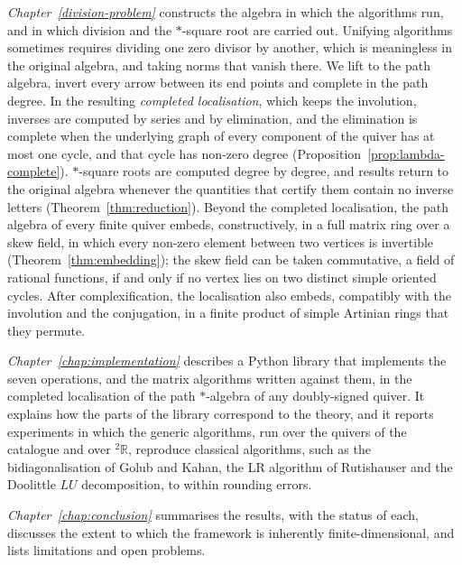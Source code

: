 \documentclass[12pt, a4paper]{report}
\theoremstyle{plain}
\theoremstyle{definition}
\theoremstyle{remark}
\theoremstyle{plain}
\newcommand{\twoR}{{}^{2}\mathbb{R}}
\begin{document}
\emph{Chapter~\ref{division-problem}} constructs the algebra in which the algorithms run, and in which division and the $*$-square root are carried out. Unifying algorithms sometimes requires dividing one zero divisor by another, which is meaningless in the original algebra, and taking norms that vanish there. We lift to the path algebra, invert every arrow between its end points and complete in the path degree. In the resulting \emph{completed localisation}, which keeps the involution, inverses are computed by series and by elimination, and the elimination is complete when the underlying graph of every component of the quiver has at most one cycle, and that cycle has non-zero degree (Proposition~\ref{prop:lambda-complete}). $*$-square roots are computed degree by degree, and results return to the original algebra whenever the quantities that certify them contain no inverse letters (Theorem~\ref{thm:reduction}). Beyond the completed localisation, the path algebra of every finite quiver embeds, constructively, in a full matrix ring over a skew field, in which every non-zero element between two vertices is invertible (Theorem~\ref{thm:embedding}); the skew field can be taken commutative, a field of rational functions, if and only if no vertex lies on two distinct simple oriented cycles. After complexification, the localisation also embeds, compatibly with the involution and the conjugation, in a finite product of simple Artinian rings that they permute.

\emph{Chapter~\ref{chap:implementation}} describes a Python library that implements the seven operations, and the matrix algorithms written against them, in the completed localisation of the path $*$-algebra of any doubly-signed quiver. It explains how the parts of the library correspond to the theory, and it reports experiments in which the generic algorithms, run over the quivers of the catalogue and over $\twoR$, reproduce classical algorithms, such as the bidiagonalisation of Golub and Kahan, the LR algorithm of Rutishauser and the Doolittle $LU$ decomposition, to within rounding errors.

\emph{Chapter~\ref{chap:conclusion}} summarises the results, with the status of each, discusses the extent to which the framework is inherently finite-dimensional, and lists limitations and open problems.
\end{document}
